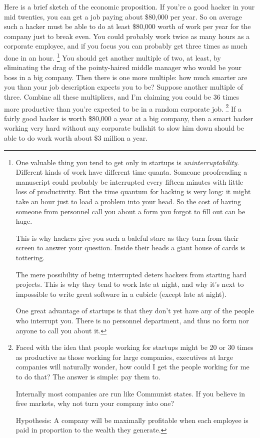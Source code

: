 Here is a brief sketch of the economic proposition. If you're a good
hacker in your mid twenties, you can get a job paying about \$80,000 per
year. So on average such a hacker must be able to do at least \$80,000
worth of work per year for the company just to break even. You could
probably work twice as many hours as a corporate employee, and if you
focus you can probably get three times as much done in an hour.
\footnote{One valuable thing you tend to get only in startups is
\emph{uninterruptability}. Different kinds of work have different time
quanta. Someone proofreading a manuscript could probably be interrupted
every fifteen minutes with little loss of productivity. But the time
quantum for hacking is very long: it might take an hour just to load a
problem into your head. So the cost of having someone from personnel
call you about a form you forgot to fill out can be huge.

This is why hackers give you such a baleful stare as they turn from
their screen to answer your question. Inside their heads a giant house
of cards is tottering.

The mere possibility of being interrupted deters hackers from starting
hard projects. This is why they tend to work late at night, and why it's
next to impossible to write great software in a cubicle (except late at
night).

One great advantage of startups is that they don't yet have any of the
people who interrupt you. There is no personnel department, and thus no
form nor anyone to call you about it.} You should get another multiple of two, at
least, by eliminating the drag of the pointy-haired middle manager who
would be your boss in a big company. Then there is one more multiple:
how much smarter are you than your job description expects you to be?
Suppose another multiple of three. Combine all these multipliers, and
I'm claiming you could be 36 times more productive than you're expected
to be in a random corporate job. \footnote{Faced with the idea that people working for startups might be 20
or 30 times as productive as those working for large companies,
executives at large companies will naturally wonder, how could I get the
people working for me to do that? The answer is simple: pay them to.

Internally most companies are run like Communist states. If you believe
in free markets, why not turn your company into one?

Hypothesis: A company will be maximally profitable when each employee is
paid in proportion to the wealth they generate.} If a fairly
good hacker is worth \$80,000 a year at a big company, then a smart
hacker working very hard without any corporate bullshit to slow him down
should be able to do work worth about \$3 million a year.

